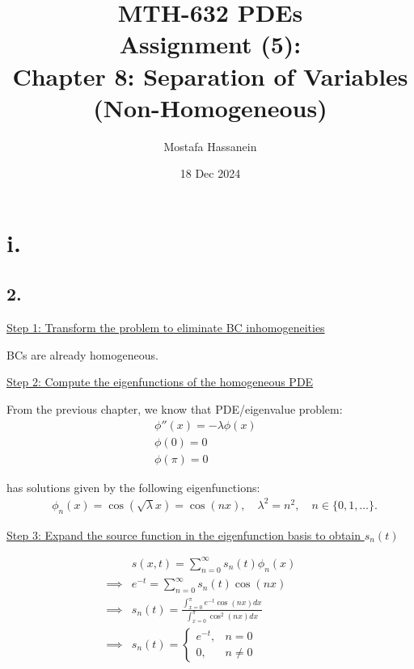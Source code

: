 \documentclass{article}
\author{Mostafa Hassanein}
\title{
  MTH-632 PDEs \\
  Assignment (5): \\ Chapter 8: Separation of Variables (Non-Homogeneous)}
\date{18 Dec 2024}
\begin{document}
\maketitle
\newpage

\section*{i.}
\subsection*{2.}

\underline{Step 1: Transform the problem to eliminate BC inhomogeneities}
\newline

BCs are already homogeneous.
\newline

\noindent
\underline{Step 2: Compute the eigenfunctions of the homogeneous PDE}
\newline

From the previous chapter, we know that PDE/eigenvalue problem:
\begin{align*}
  &\phi''(x) = -\lambda \phi(x) &&\\
  &\phi(0) = 0 &&\\
  &\phi(\pi) = 0
\end{align*}

has solutions given by the following eigenfunctions:
\begin{align*}
  &\phi_n(x) = \cos(\sqrt{\lambda} x) = \cos(n x), \quad \lambda^2 = n^2, \quad n \in \{0, 1, \ldots\}.
\end{align*}

\noindent
\underline{Step 3: Expand the source function in the eigenfunction basis to obtain $s_n(t)$}
\newline

\begin{align*}
  &s(x, t) = \sum_{n=0}^{\infty} s_n(t) \phi_n(x) &&\\
  \implies&e^{-t} = \sum_{n=0}^{\infty} s_n(t) \cos(n x) &&\\
  \implies&s_n(t) = \frac{\int_{x=0}^{\pi} e^{-t} \cos(n x) dx}{\int_{x=0}^{\pi} \cos^2(n x) dx} &&\\
  \implies& s_n(t) = \begin{cases}
    e^{-t}, &n=0 \\
    0, &n \neq 0
  \end{cases}
\end{align*}
\end{document}
